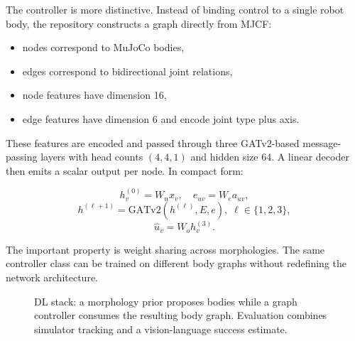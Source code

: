 \documentclass[10pt,letterpaper,twocolumn]{article}
\begin{document}
The controller is more distinctive. Instead of binding control to a single robot body, the repository constructs a graph directly from MJCF:

\begin{itemize}[leftmargin=4mm,itemsep=1pt]
\item nodes correspond to MuJoCo bodies,
\item edges correspond to bidirectional joint relations,
\item node features have dimension 16,
\item edge features have dimension 6 and encode joint type plus axis.
\end{itemize}

These features are encoded and passed through three GATv2-based message-passing layers with head counts $(4,4,1)$ and hidden size 64. A linear decoder then emits a scalar output per node. In compact form:

\begin{equation}
h^{(0)}_v=W_n x_v,\quad e_{uv}=W_e a_{uv},
\end{equation}
\begin{equation}
h^{(\ell+1)}=\mathrm{GATv2}\!\left(h^{(\ell)}, E, e\right),\;\ell\in\{1,2,3\},
\end{equation}
\begin{equation}
\hat{u}_v = W_o h^{(3)}_v.
\end{equation}

The important property is weight sharing across morphologies. The same controller class can be trained on different body graphs without redefining the network architecture.

\begin{figure}[t]
\centering
{}
\caption{DL stack: a morphology prior proposes bodies while a graph controller consumes the resulting body graph. Evaluation combines simulator tracking and a vision-language success estimate.}
\label{fig:dl}
\end{figure}
\end{document}

